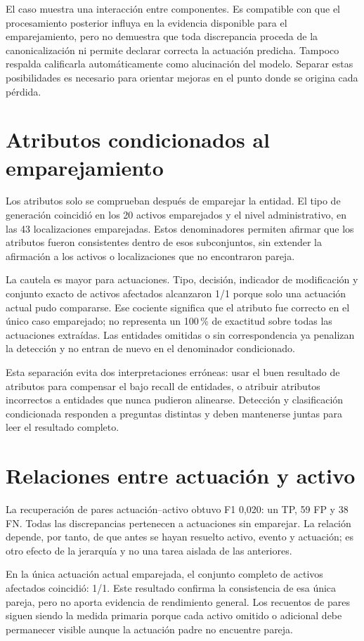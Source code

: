 El caso muestra una interacción entre componentes. Es compatible con que el
procesamiento posterior influya en la evidencia disponible para el
emparejamiento, pero no demuestra que toda discrepancia proceda de la
canonicalización ni permite declarar correcta la actuación predicha. Tampoco
respalda calificarla automáticamente como alucinación del modelo. Separar estas
posibilidades es necesario para orientar mejoras en el punto donde se origina
cada pérdida.

\section{Atributos condicionados al emparejamiento}
Los atributos solo se comprueban después de emparejar la entidad. El tipo de
generación coincidió en los 20 activos emparejados y el nivel administrativo,
en las 43 localizaciones emparejadas. Estos denominadores permiten afirmar que
los atributos fueron consistentes dentro de esos subconjuntos, sin extender la
afirmación a los activos o localizaciones que no encontraron pareja.

La cautela es mayor para actuaciones. Tipo, decisión, indicador de modificación
y conjunto exacto de activos afectados alcanzaron 1/1 porque solo una actuación
actual pudo compararse. Ese cociente significa que el atributo fue correcto en
el único caso emparejado; no representa un 100\,\% de exactitud sobre todas las
actuaciones extraídas. Las entidades omitidas o sin correspondencia ya
penalizan la detección y no entran de nuevo en el denominador condicionado.

Esta separación evita dos interpretaciones erróneas: usar el buen resultado de
atributos para compensar el bajo recall de entidades, o atribuir atributos
incorrectos a entidades que nunca pudieron alinearse. Detección y clasificación
condicionada responden a preguntas distintas y deben mantenerse juntas para
leer el resultado completo.

\section{Relaciones entre actuación y activo}
La recuperación de pares actuación--activo obtuvo F1 0,020: un TP, 59 FP y 38
FN. Todas las discrepancias pertenecen a actuaciones sin emparejar. La relación
depende, por tanto, de que antes se hayan resuelto activo, evento y actuación;
es otro efecto de la jerarquía y no una tarea aislada de las anteriores.

En la única actuación actual emparejada, el conjunto completo de activos
afectados coincidió: 1/1. Este resultado confirma la consistencia de esa única
pareja, pero no aporta evidencia de rendimiento general. Los recuentos de
pares siguen siendo la medida primaria porque cada activo omitido o adicional
debe permanecer visible aunque la actuación padre no encuentre pareja.

